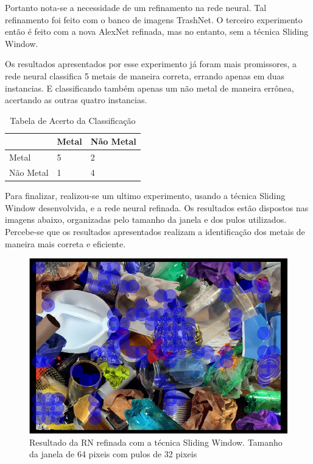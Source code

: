\documentclass[conference, compsoc, 12pt]{IEEEtran}
\begin{document}
Portanto nota-se a necessidade de um refinamento na rede neural. Tal refinamento foi feito com o banco de imagens TrashNet. O terceiro experimento então é feito com a nova AlexNet refinada, mas no entanto, sem a técnica Sliding Window.

Os resultados apresentados por esse experimento já foram mais promissores, a rede neural classifica 5 metais de maneira correta, errando apenas em duas instancias. E classificando também apenas um não metal de maneira errônea, acertando as outras quatro instancias.

\begin{table}[]
\centering
\caption{Tabela de Acerto da Classificação}
\begin{tabular}{|l|l|l|}
\hline
          & Metal & Não Metal \\ \hline
Metal     & 5     & 2         \\ \hline
Não Metal & 1     & 4         \\ \hline
\end{tabular}
\end{table}

Para finalizar, realizou-se um ultimo experimento, usando a técnica Sliding Window desenvolvida, e a rede neural refinada. Os resultados estão dispostos nas imagens abaixo, organizadas pelo tamanho da janela e dos pulos utilizados. Percebe-se que os resultados apresentados realizam a identificação dos metais de maneira mais correta e eficiente.

\begin{figure}[H]
    \centering
    \includegraphics[width=.9\linewidth]{trained_64_32.png}
    \caption{Resultado da RN refinada com a técnica Sliding Window. Tamanho da janela de 64 pixeis com pulos de 32 pixeis}
\end{figure}
\end{document}
